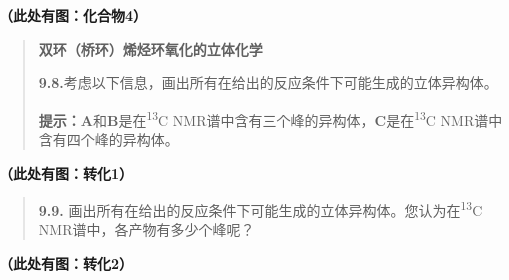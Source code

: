 \textbf{（此处有图：化合物4）}

\begin{quote}
\textbf{双环（桥环）烯烃环氧化的立体化学}

\textbf{9.8.}考虑以下信息，画出所有在给出的反应条件下可能生成的立体异构体。

\textbf{提示：A}和\textbf{B}是在\textsuperscript{13}C
NMR谱中含有三个峰的异构体，\textbf{C}是在\textsuperscript{13}C
NMR谱中含有四个峰的异构体。
\end{quote}

\textbf{（此处有图：转化1）}

\begin{quote}
\textbf{9.9.}
画出所有在给出的反应条件下可能生成的立体异构体。您认为在\textsuperscript{13}C
NMR谱中，各产物有多少个峰呢？
\end{quote}

\textbf{（此处有图：转化2）}
